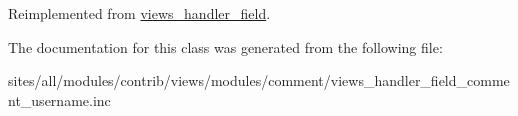 Reimplemented from \hyperlink{classviews__handler__field_82ff951c5e9ceb97b2eab86f880cbc1e}{views\_\-handler\_\-field}.

The documentation for this class was generated from the following file:\begin{CompactItemize}
\item 
sites/all/modules/contrib/views/modules/comment/views\_\-handler\_\-field\_\-comment\_\-username.inc\end{CompactItemize}
